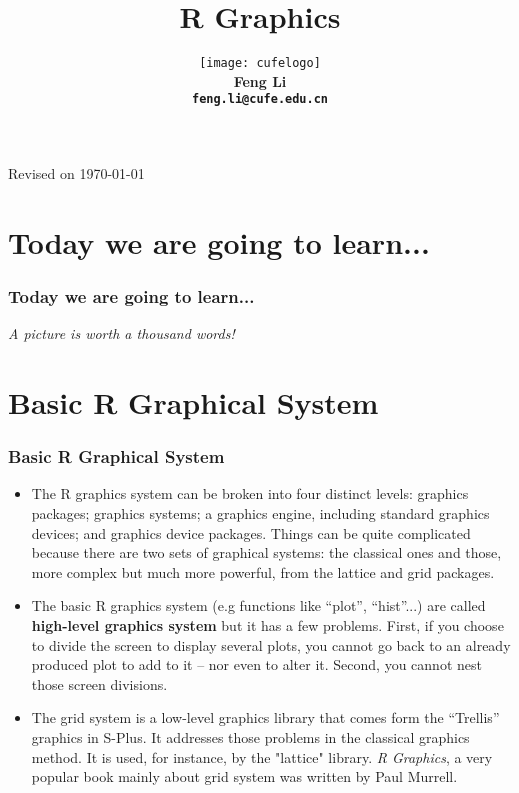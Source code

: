 \documentclass[10pt]{beamer}
\title[Statistical Computing]{{\textbf{R Graphics}}}
\author[Feng Li]{\texttt{[image: cufelogo]}\\
  \vspace{0.5cm}\textbf{Feng Li\\\texttt{feng.li@cufe.edu.cn}}}
\institute[SAM.CUFE.EDU.CN]{\footnotesize{\textbf{School of
      Statistics and Mathematics\\ Central University of Finance and
      Economics}}}
\date{}
\begin{document}
\begin{frame}[plain]
  \titlepage
  \tiny{Revised on \today}
\end{frame}


\section*{Today we are going to learn...}
\begin{frame}
  \frametitle{Today we are going to learn...}
  \tableofcontents
\end{frame}


\begin{frame}
\begin{center}
{\em A picture is worth a thousand words!}
\end{center}

\end{frame}



\section{Basic R Graphical System}


\begin{frame}
\frametitle{Basic R Graphical System}
  \begin{itemize}
  \item The R graphics system can be broken into four distinct levels:
    graphics packages; graphics systems; a graphics engine, including
    standard graphics devices; and graphics device packages. Things
    can be quite complicated because there are two sets of graphical
    systems: the classical ones and those, more
    complex but much more powerful, from the lattice and grid packages.\\

  \item The basic R graphics system (e.g functions like ``plot'',
    ``hist''...)  are called \textbf{high-level graphics system} but
    it has a few problems. First, if you choose to divide the screen
    to display several plots, you cannot go back to an already
    produced plot to add to it -- nor even to alter it. Second, you
    cannot nest those screen divisions.

  \item The grid system is a low-level graphics library that comes
    form the ``Trellis'' graphics in S-Plus. It addresses those
    problems in the classical graphics method. It is used, for
    instance, by the "lattice" library. {\em R Graphics}, a very
    popular book mainly about grid system was written by Paul Murrell.
  \end{itemize}
\end{frame}
\end{document}

